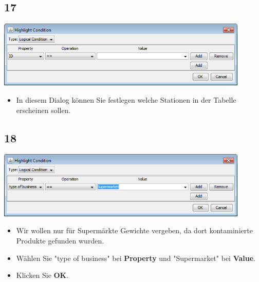 \documentclass{beamer}
\begin{document}
\subsection{17}
\begin{frame}
	\begin{center}
  		\includegraphics[width=0.9\textwidth]{17.png}
	\end{center}
	\begin{itemize}
		\item In diesem Dialog können Sie festlegen welche Stationen in der Tabelle erscheinen sollen.
	\end{itemize}
\end{frame}

\subsection{18}
\begin{frame}
	\begin{center}
  		\includegraphics[width=0.9\textwidth]{18.png}
	\end{center}
	\begin{itemize}
		\item Wir wollen nur für Supermärkte Gewichte vergeben, da dort kontaminierte Produkte gefunden wurden.
		\item Wählen Sie "type of business" bei \textbf{Property} und "Supermarket" bei \textbf{Value}.
		\item Klicken Sie \textbf{OK}.
	\end{itemize}
\end{frame}
\end{document}
